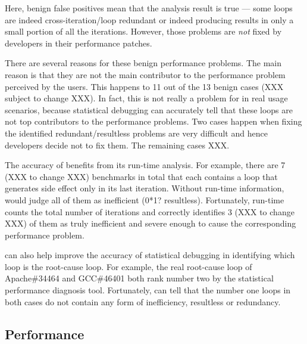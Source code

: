 Here, benign false positives mean that the \Tool analysis result is true ---
some loops are indeed cross-iteration/loop redundant or indeed producing
results in only a small portion of all the iterations. However, those
problems are \textit{not} fixed by developers in their performance patches. 

There are several reasons for these benign performance problems. 
The main reason is that they are not the main contributor to the 
performance problem perceived by the users. This happens to 11 out of the
13 benign cases (XXX subject to change XXX). 
In fact, this is not really a problem for \Tool in 
real usage scenarios, because statistical debugging can accurately
tell that these loops are not top contributors to the performance
problems.
Two cases happen when fixing the 
identified redundant/resultless problems
are very difficult and hence developers decide not to fix them.
The remaining cases XXX.


The accuracy of \Tool benefits from its run-time analysis.
For example, there are 7 (XXX to change XXX) benchmarks in total that each contains
a loop that generates side effect only
in its last iteration. Without run-time information, \Tool would judge
all of them as inefficient (0*1? resultless). Fortunately,
\Tool run-time counts the total number of iterations and
correctly identifies 3 (XXX to change XXX) of them as truly inefficient and severe enough
to cause the corresponding performance problem.

\Tool can also help improve the accuracy of statistical debugging in
identifying which loop is the root-cause loop.
For example, the real root-cause loop of Apache\#34464 and GCC\#46401 both
rank number two by the statistical performance diagnosis tool.
Fortunately,
\Tool can tell that the number one loops in both cases do not contain
any form of inefficiency, resultless or redundancy. 

\subsection{Performance}
\label{sec:result_perf}

